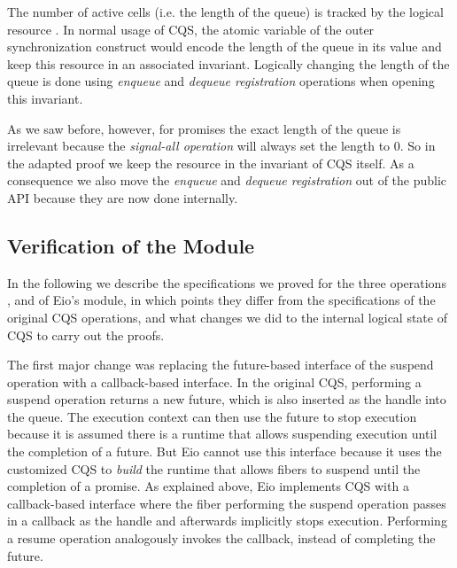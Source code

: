 The number of active cells  (i.e. the length of the queue) is tracked by the logical resource .
In normal usage of CQS, the atomic variable of the outer synchronization construct would encode the length of the queue in its value and keep this resource in an associated invariant.
Logically changing the length of the queue is done using \textit{enqueue} and \textit{dequeue registration} operations when opening this invariant.

As we saw before, however, for promises the exact length of the queue is irrelevant because the \textit{signal-all operation} will always set the length to 0.
So in the adapted proof we keep the  resource in the invariant of CQS itself.
As a consequence we also move the \textit{enqueue} and \textit{dequeue registration} out of the public API because they are now done internally.

\subsection{Verification of the  Module}
\label{sec:cqs-spec}

In the following we describe the specifications we proved for the three operations ,  and  of Eio's  module, in which points they differ from the specifications of the original CQS operations, and what changes we did to the internal logical state of CQS to carry out the proofs.


The first major change was replacing the future-based interface of the suspend operation with a callback-based interface.
In the original CQS, performing a suspend operation returns a new future, which is also inserted as the handle into the queue.
The execution context can then use the future to stop execution because it is assumed there is a runtime that allows suspending execution until the completion of a future.
But Eio cannot use this interface because it uses the customized CQS to \textit{build} the runtime that allows fibers to suspend until the completion of a promise.
As explained above, Eio implements CQS with a callback-based interface where the fiber performing the suspend operation passes in a callback as the handle and afterwards implicitly stops execution.
Performing a resume operation analogously invokes the callback, instead of completing the future.

